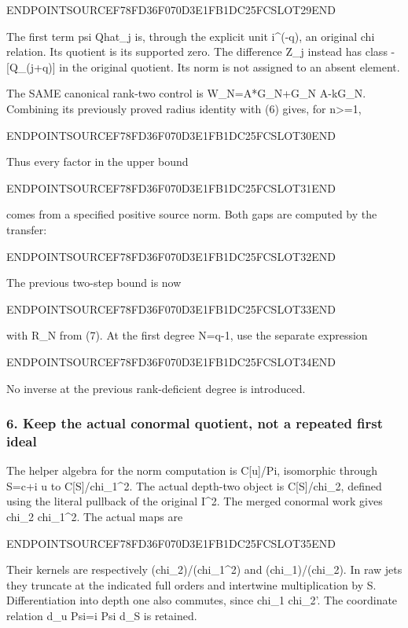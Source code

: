 ENDPOINTSOURCEF78FD36F070D3E1FB1DC25FCSLOT29END

The first term psi Qhat\_j is, through the explicit unit i\^{}(-q), an original chi relation. Its quotient is its supported zero. The difference Z\_j instead has class -{[}Q\_(j+q){]} in the original quotient. Its norm is not assigned to an absent element.

The SAME canonical rank-two control is W\_N=A*G\_N+G\_N A-kG\_N. Combining its previously proved radius identity with (6) gives, for n\textgreater=1,

ENDPOINTSOURCEF78FD36F070D3E1FB1DC25FCSLOT30END

Thus every factor in the upper bound

ENDPOINTSOURCEF78FD36F070D3E1FB1DC25FCSLOT31END

comes from a specified positive source norm. Both gaps are computed by the transfer:

ENDPOINTSOURCEF78FD36F070D3E1FB1DC25FCSLOT32END

The previous two-step bound is now

ENDPOINTSOURCEF78FD36F070D3E1FB1DC25FCSLOT33END

with R\_N from (7). At the first degree N=q-1, use the separate expression

ENDPOINTSOURCEF78FD36F070D3E1FB1DC25FCSLOT34END

No inverse at the previous rank-deficient degree is introduced.

\subsubsection{6. Keep the actual conormal quotient, not a repeated first ideal}\label{endpoint-pr24_current_corrected--keep-the-actual-conormal-quotient-not-a-repeated-first-ideal}

The helper algebra for the norm computation is C{[}u{]}/Pi, isomorphic through S=c+i u to C{[}S{]}/chi\_1\^{}2. The actual depth-two object is C{[}S{]}/chi\_2, defined using the literal pullback of the original I\^{}2. The merged conormal work gives chi\_2 \textbar{} chi\_1\^{}2. The actual maps are

ENDPOINTSOURCEF78FD36F070D3E1FB1DC25FCSLOT35END

Their kernels are respectively (chi\_2)/(chi\_1\^{}2) and (chi\_1)/(chi\_2). In raw jets they truncate at the indicated full orders and intertwine multiplication by S. Differentiation into depth one also commutes, since chi\_1 \textbar{} chi\_2'. The coordinate relation d\_u Psi=i Psi d\_S is retained.

